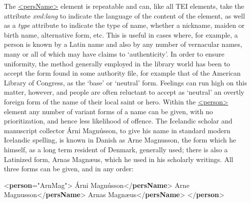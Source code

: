 The \hyperref[TEI.persName]{<persName>} element is repeatable and can, like all TEI elements, take the attribute {\itshape xml:lang} to indicate the language of the content of the element, as well as a {\itshape type} attribute to indicate the type of name, whether a nickname, maiden or birth name, alternative form, etc. This is useful in cases where, for example, a person is known by a Latin name and also by any number of vernacular names, many or all of which may have claims to ‘authenticity’. In order to ensure uniformity, the method generally employed in the library world has been to accept the form found in some authority file, for example that of the American Library of Congress, as the ‘base’ or ‘neutral’ form. Feelings can run high on this matter, however, and people are often reluctant to accept as ‘neutral’ an overtly foreign form of the name of their local saint or hero. Within the \hyperref[TEI.person]{<person>} element any number of variant forms of a name can be given, with no prioritization, and hence less likelihood of offence. The Icelandic scholar and manuscript collector Árni Magnússon, to give his name in standard modern Icelandic spelling, is known in Danish as Arne Magnusson, the form which he himself, as a long term resident of Denmark, generally used; there is also a Latinized form, Arnas Magnæus, which he used in his scholarly writings. All three forms can be given, and in any order: \par\bgroup{}\exampleFont \begin{shaded}\noindent\mbox{}{<\textbf{person}\hspace*{1em}{xml:id}="{ArnMag}">}\mbox{}\newline 
{}Árni Magnússon{</\textbf{persName}>}\mbox{}\newline 
{}Arne Magnusson{</\textbf{persName}>}\mbox{}\newline 
{}Arnas Magnæus{</\textbf{persName}>}\mbox{}\newline 
{</\textbf{person}>}\end{shaded}\egroup\par \par
